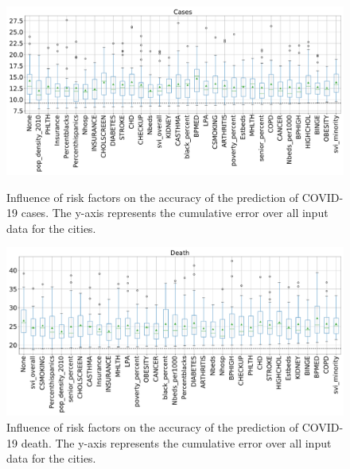 \documentclass[12pt]{article}
\theoremstyle{definition}
\renewcommand{\_}{%
    \textunderscore\hspace{0pt}%
}
\begin{document}
\begin{figure}[!p]
    \centering
    \includegraphics[width=1.0\textwidth]{images/boxwhisker/boxplot_cases.pdf}
    \vspace{-1cm}
    \caption{Influence of risk factors on the accuracy of the prediction of COVID-19 cases. The y-axis represents the cumulative error over all input data for the cities.}
    \label{fig:box-cases}
    \bigskip

    \includegraphics[width=1.0\textwidth]{images/boxwhisker/boxplot_death.pdf}
    \vspace{-1cm}
    \caption{Influence of risk factors on the accuracy of the prediction of COVID-19 death. The y-axis represents the cumulative error over all input data for the cities.}
    \label{fig:box-death}
\end{figure}
\end{document}
